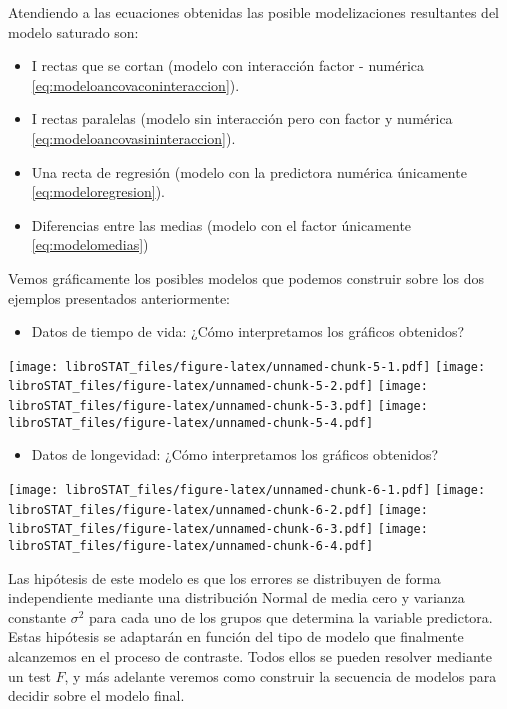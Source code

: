 \documentclass[
]{book}
\providecommand{\tightlist}{%
  \setlength{\itemsep}{0pt}\setlength{\parskip}{0pt}}
\theoremstyle{definition}
\theoremstyle{definition}
\theoremstyle{definition}
\theoremstyle{remark}
\begin{document}
Atendiendo a las ecuaciones obtenidas las posible modelizaciones resultantes del modelo saturado son:

\begin{itemize}
\tightlist
\item
  I rectas que se cortan (modelo con interacción factor - numérica \eqref{eq:modeloancovaconinteraccion}).
\item
  I rectas paralelas (modelo sin interacción pero con factor y numérica \eqref{eq:modeloancovasininteraccion}).
\item
  Una recta de regresión (modelo con la predictora numérica únicamente \eqref{eq:modeloregresion}).
\item
  Diferencias entre las medias (modelo con el factor únicamente \eqref{eq:modelomedias})
\end{itemize}

Vemos gráficamente los posibles modelos que podemos construir sobre los dos ejemplos presentados anteriormente:

\begin{itemize}
\tightlist
\item
  Datos de tiempo de vida: ¿Cómo interpretamos los gráficos obtenidos?
\end{itemize}

\texttt{[image: libroSTAT\_files/figure-latex/unnamed-chunk-5-1.pdf]} \texttt{[image: libroSTAT\_files/figure-latex/unnamed-chunk-5-2.pdf]} \texttt{[image: libroSTAT\_files/figure-latex/unnamed-chunk-5-3.pdf]} \texttt{[image: libroSTAT\_files/figure-latex/unnamed-chunk-5-4.pdf]}

\begin{itemize}
\tightlist
\item
  Datos de longevidad: ¿Cómo interpretamos los gráficos obtenidos?
\end{itemize}

\texttt{[image: libroSTAT\_files/figure-latex/unnamed-chunk-6-1.pdf]} \texttt{[image: libroSTAT\_files/figure-latex/unnamed-chunk-6-2.pdf]} \texttt{[image: libroSTAT\_files/figure-latex/unnamed-chunk-6-3.pdf]} \texttt{[image: libroSTAT\_files/figure-latex/unnamed-chunk-6-4.pdf]}

Las hipótesis de este modelo es que los errores se distribuyen de forma independiente mediante una distribución Normal de media cero y varianza constante \(\sigma^2\) para cada uno de los grupos que determina la variable predictora. Estas hipótesis se adaptarán en función del tipo de modelo que finalmente alcanzemos en el proceso de contraste. Todos ellos se pueden resolver mediante un test \(F\), y más adelante veremos como construir la secuencia de modelos para decidir sobre el modelo final.
\end{document}
